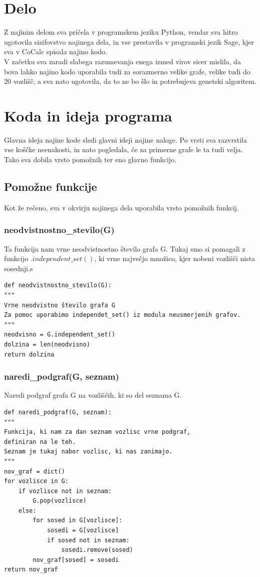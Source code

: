 \documentclass[12pt,a4paper]{amsart}
\theoremstyle{definition} %
\theoremstyle{plain} %
\begin{document}
\section{Delo}
Z najinim delom sva pričela v programskem jeziku Python, vendar sva hitro ugotovila sizifovstvo najinega dela, in vse prestavila v programski jezik Sage, kjer sva v CoCalc spisala najino kodo. \\
V začetku sva zaradi slabega razumevanja enega izmed virov sicer mislila, da bova lahko najino kodo uporabila tudi za sorazmerno velike grafe, velike tudi do 20 vozlišč, a sva nato ugotovila, da to ne bo šlo in potrebujeva genetski algoritem.
\section{Koda in ideja programa}
Glavna ideja najine kode sledi glavni ideji najine naloge. Po vrsti sva razvrstila vse koščke neenakosti, in nato pogledala, če za primerne grafe le ta tudi velja. Tako sva dobila vrsto pomožnih ter eno glavno funkcijo.
\subsection{Pomožne funkcije}
Kot že rečeno, sva v okvirju najinega dela uporabila vrsto pomožnih funkcij. 
\subsubsection{neodvistnostno\_stevilo(G)}
Ta funkcija nam vrne neodvistnostno število grafa G. Tukaj smo si pomagali z funkcijo $.independent\_set()$, ki vrne največjo množico, kjer nobeni vozlišči nista sosednji.s 
\begin{verbatim}
def neodvistnostno_stevilo(G):
"""
Vrne neodvistno število grafa G
Za pomoc uporabimo independet_set() iz modula neusmerjenih grafov.
"""
neodvisno = G.independent_set()
dolzina = len(neodvisno)
return dolzina
\end{verbatim}

\subsubsection{naredi\_podgraf(G, seznam)}
Naredi podgraf grafa G na vozliščih, ki so del seznama G.
\begin{verbatim}
def naredi_podgraf(G, seznam):
"""
Funkcija, ki nam za dan seznam vozlisc vrne podgraf, 
definiran na le teh.
Seznam je tukaj nabor vozlisc, ki nas zanimajo.
"""
nov_graf = dict()
for vozlisce in G:
    if vozlisce not in seznam:
        G.pop(vozlisce)
    else:
        for sosed in G[vozlisce]:
            sosedi = G[vozlisce]
            if sosed not in seznam:
                sosedi.remove(sosed)
        nov_graf[sosed] = sosedi
return nov_graf

\end{verbatim}
\end{document}
